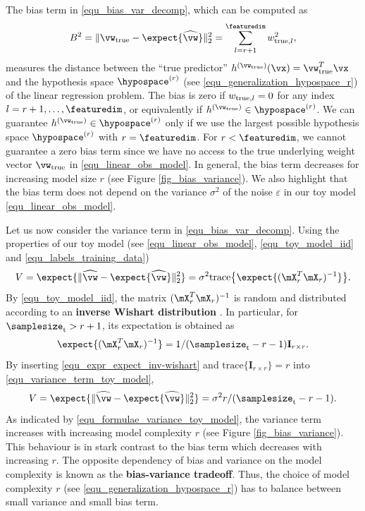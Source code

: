 \documentclass[12pt]{report}
\begin{document}
The bias term in \eqref{equ_bias_var_decomp}, which can be computed as 
\vspace*{-3mm}
\begin{equation}
\label{equ_def_bias_term}
B^{2} = \| \vw_{\rm true} - \expect \{ \widehat{\vw} \} \|^{2}_{2} = \sum_{l=r+1}^{\featuredim} w_{{\rm true},l}^2, 
\end{equation} 
measures the distance between the ``true predictor'' $h^{(\vw_{\rm true})}(\vx)=\vw_{\rm true}^{T} \vx$ and the 
hypothesis space $\hypospace^{(r)}$ (see \eqref{equ_generalization_hypospace_r}) of the linear regression problem. 
The bias is zero if $w_{{\rm true},l}=0$ for any index $l=r+1,\ldots,\featuredim$, or equivalently if $h^{(\vw_{\rm true})} \in \hypospace^{(r)}$. 
We can guarantee $h^{(\vw_{\rm true})} \in \hypospace^{(r)}$ only if we use the largest possible hypothesis 
space $\hypospace^{(r)}$ with $r=\featuredim$. For $r < \featuredim$, we cannot guarantee a zero bias term since we 
have no access to the true underlying weight vector $\vw_{\rm true}$ in \eqref{equ_linear_obs_model}. In general, the 
bias term decreases for increasing model size $r$ (see Figure \ref{fig_bias_variance}). We also highlight that the bias 
term does not depend on the variance $\sigma^{2}$ of the noise $\varepsilon$ in our toy model \eqref{equ_linear_obs_model}. 

Let us now consider the variance term in \eqref{equ_bias_var_decomp}. Using the properties of our toy model 
(see \eqref{equ_linear_obs_model}, \eqref{equ_toy_model_iid} and \eqref{equ_labels_training_data})
\begin{equation}
\label{equ_variance_term_toy_model}
V = \expect \{ \| \widehat{\vw} - \expect\{ \widehat{\vw} \} \|^{2}_{2} \} = \sigma^{2} \mbox{trace} \big\{ \expect\{(\mX_{r}^{T} \mX_{r})^{-1} \} \big\}.
\end{equation} 
By \eqref{equ_toy_model_iid}, the matrix $(\mX_{r}^{T} \mX_{r})^{-1}$ is random and distributed according to an 
{\bf inverse Wishart distribution} \cite{Mardia1979}. In particular, for $\samplesize_{\rm t} > r +1$, its expectation 
is obtained as 
\begin{equation} 
\label{equ_expr_expect_inv-wishart}
\expect\{(\mX_{r}^{T} \mX_{r})^{-1} \} = 1/(\samplesize_{\rm t}-r-1) \mathbf{I}_{r \times r}.
\end{equation} 
By inserting \eqref{equ_expr_expect_inv-wishart} and $\mbox{trace} \{ \mathbf{I}_{r \times r} \} = r$ into \eqref{equ_variance_term_toy_model}, 
\begin{equation} 
\label{equ_formulae_variance_toy_model}
V= \expect \{ \| \widehat{\vw} - \expect\{ \widehat{\vw} \} \|^{2}_{2} \} = \sigma^{2} r/(\samplesize_{\rm t}-r-1). 
\end{equation} 
As indicated by \eqref{equ_formulae_variance_toy_model}, the 
variance term increases with increasing model complexity $r$ 
(see Figure \ref{fig_bias_variance}). This behaviour is in stark 
contrast to the bias term which decreases with increasing $r$. 
The opposite dependency of bias and variance on the model 
complexity is known as the {\bf bias-variance tradeoff}. Thus, 
the choice of model complexity $r$ (see \eqref{equ_generalization_hypospace_r}) 
has to balance between small variance and small bias term. 
\end{document}
